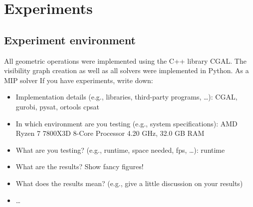 \chapter{Experiments}
\section{Experiment environment}
All geometric operations were implemented using the C++ library CGAL. The visibility graph creation as well as all solvers were implemented in Python. As a MIP solver 
If you have experiments, write down:
\begin{itemize}
	\item Implementation details (e.g., libraries, third-party programs, \dots): CGAL, gurobi, pysat, ortools cpsat
	\item In which environment are you testing (e.g., system specifications): AMD Ryzen 7 7800X3D 8-Core Processor 4.20 GHz, 32.0 GB RAM
	\item What are you testing? (e.g., runtime, space needed, fps, \dots): runtime
	\item What are the results? Show fancy figures!
	\item What does the results mean? (e.g., give a little discussion on your results)
	\item \dots
\end{itemize}